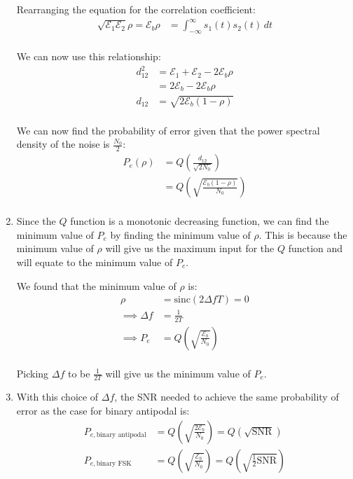 \documentclass{article}
\begin{document}
\begin{enumerate}[label=3.\arabic*]
    Rearranging the equation for the correlation coefficient:
    \begin{align*}
        \sqrt{\mathcal{E}_1 \mathcal{E}_2} \rho = \mathcal{E}_b\rho &= \int_{-\infty}^{\infty} s_1(t)s_2(t) \, dt \\
    \end{align*}

    We can now use this relationship:
    \begin{align*}
        d_{12}^2 &= \mathcal{E}_1 + \mathcal{E}_2 - 2\mathcal{E}_b\rho \\
        &= 2\mathcal{E}_b - 2\mathcal{E}_b\rho \\
        d_{12} &= \sqrt{2\mathcal{E}_b(1 - \rho)} \\
    \end{align*}

    We can now find the probability of error given that the power spectral density of the noise is $\frac{N_0}{2}$:
    \begin{align*}
        P_e(\rho) &= Q\left(\frac{d_{12}}{\sqrt{2N_0}}\right) \\
        &= Q\left(\sqrt{\frac{\mathcal{E}_b(1 - \rho)}{N_0}}\right) \\
    \end{align*}        

    \item Since the $Q$ function is a monotonic decreasing function, we can find the minimum value of $P_e$ by finding the minimum value of $\rho$. This is because the minimum value of $\rho$ will give us the maximum input for the $Q$ function and will equate to the minimum value of $P_e$.
    
    We found that the minimum value of $\rho$ is:
    \begin{align*}
        \rho &= \text{sinc}(2\Delta f T) = 0 \\
        \implies \Delta f &= \frac{1}{2T} \\
        \implies P_e &= Q\left(\sqrt{\frac{\mathcal{E}_b}{N_0}}\right) \\
    \end{align*}

    Picking $\Delta f$ to be $\frac{1}{2T}$ will give us the minimum value of $P_e$.

    \item With this choice of $\Delta f$, the SNR needed to achieve the same probability of error as the case for binary antipodal is:
    \begin{align*}
        P_{e, \text{binary antipodal}} &= Q\left(\sqrt{\frac{2\mathcal{E}_b}{N_0}}\right) = Q\left(\sqrt{\text{SNR}}\right) \\
        P_{e, \text{binary FSK}} &= Q\left(\sqrt{\frac{\mathcal{E}_b}{N_0}}\right) = Q\left(\sqrt{\frac{1}{2}\text{SNR}}\right) \\
    \end{align*}


\end{enumerate}
\end{document}
